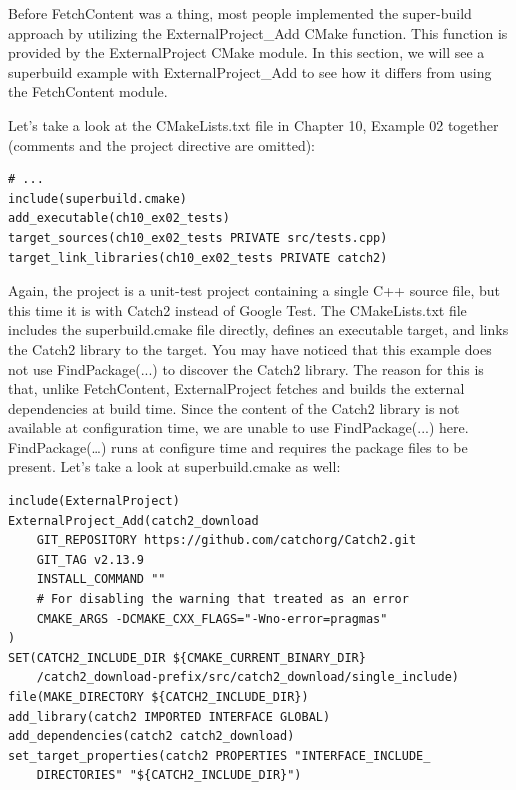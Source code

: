 
Before FetchContent was a thing, most people implemented the super-build approach by utilizing the ExternalProject\_Add CMake function. This function is provided by the ExternalProject CMake module. In this section, we will see a superbuild example with ExternalProject\_Add to see how it differs from using the FetchContent module.

Let's take a look at the CMakeLists.txt file in Chapter 10, Example 02 together (comments and the project directive are omitted):

\begin{lstlisting}[style=styleCMake]
# ...
include(superbuild.cmake)
add_executable(ch10_ex02_tests)
target_sources(ch10_ex02_tests PRIVATE src/tests.cpp)
target_link_libraries(ch10_ex02_tests PRIVATE catch2)
\end{lstlisting}

Again, the project is a unit-test project containing a single C++ source file, but this time it is with Catch2 instead of Google Test. The CMakeLists.txt file includes the superbuild.cmake file directly, defines an executable target, and links the Catch2 library to the target. You may have noticed that this example does not use FindPackage(...) to discover the Catch2 library. The reason for this is that, unlike FetchContent, ExternalProject fetches and builds the external dependencies at build time. Since the content of the Catch2 library is not available at configuration time, we are unable to use FindPackage(...) here. FindPackage(…) runs at configure time and requires the package files to be present. Let's take a look at superbuild.cmake as well:

\begin{lstlisting}[style=styleCMake]
include(ExternalProject)
ExternalProject_Add(catch2_download
	GIT_REPOSITORY https://github.com/catchorg/Catch2.git
	GIT_TAG v2.13.9
	INSTALL_COMMAND ""
	# For disabling the warning that treated as an error
	CMAKE_ARGS -DCMAKE_CXX_FLAGS="-Wno-error=pragmas"
)
SET(CATCH2_INCLUDE_DIR ${CMAKE_CURRENT_BINARY_DIR}
	/catch2_download-prefix/src/catch2_download/single_include)
file(MAKE_DIRECTORY ${CATCH2_INCLUDE_DIR})
add_library(catch2 IMPORTED INTERFACE GLOBAL)
add_dependencies(catch2 catch2_download)
set_target_properties(catch2 PROPERTIES "INTERFACE_INCLUDE_
	DIRECTORIES" "${CATCH2_INCLUDE_DIR}")
\end{lstlisting}

